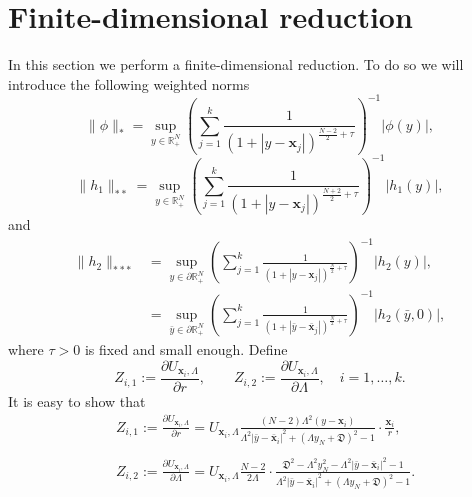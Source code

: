 \documentclass[11pt,a4paper]{amsart}
\begin{document}
\section{Finite-dimensional reduction}\label{riduzione}
In this section we perform a finite-dimensional reduction. To do so we will introduce the following weighted norms
\begin{equation}\label{norm1}
\|\phi\|_{*}=\sup _{y \in \mathbb{R}_{+}^{N}}\left(\sum_{j=1}^{k} \frac{1}{\left(1+\left|y-\mathbf{x}_{j}\right|\right)^{\frac{N-2}{2}+\tau}}\right)^{-1}|\phi(y)|,
\end{equation}
\begin{equation}\label{norm2}
\|h_1\|_{**}=\sup _{y \in \mathbb{R}_{+}^{N}}\left(\sum_{j=1}^{k} \frac{1}{\left(1+\left|y-\mathbf{x}_{j}\right|\right)^{\frac{N+2}{2}+\tau}}\right)^{-1}|h_1(y)|,
\end{equation}
and
\begin{equation}\label{norm3}
  \begin{aligned}
    \|h_2\|_{***}&=\sup _{y \in \partial\mathbb{R}_{+}^{N}}\left(\sum_{j=1}^{k} \frac{1}{\left(1+\left|y-\mathbf{x}_{j}\right|\right)^{\frac{N}{2}+\tau}}\right)^{-1}|h_2(y)|,\\
    &=\sup _{\bar{y} \in \partial\mathbb R^N_+}\left(\sum_{j=1}^{k} \frac{1}{\left(1+\left|\bar{y}-\bar{\mathbf{x}}_{j}\right|\right)^{\frac{N}{2}+\tau}}\right)^{-1}|h_2(\bar{y},0)|,
  \end{aligned}
  \end{equation}
where $\tau>0$ is fixed and small enough. 
\vspace{5pt}
Define \begin{equation}\label{ker}
Z_{i, 1}:=\frac{\partial U_{\mathbf{x}_i,\Lambda}}{\partial r},\qquad Z_{i, 2}:=\frac{\partial U_{\mathbf{x}_i,\Lambda}}{\partial \Lambda},\quad i=1, \ldots, k.\end{equation}
It is easy to show that
\begin{align}\label{eq.Z_i_1_2_expansion_1}
  &Z_{i,1} := \frac{\partial U_{\mathbf{x}_i,\Lambda}}{\partial r} = U_{\mathbf{x}_i,\Lambda}\frac{(N-2)\Lambda^2 \left(y-\mathbf{x}_i\right)}{{\Lambda^2|\bar{y}-\bar{\mathbf{x}}_{i}|}^2+{(\Lambda y_N+ \mathfrak{D})}^2-1} \cdot \frac{\mathbf{x}_i}{r},\\\nonumber\\ \label{eq.Z_i_1_2_expansion_2}
  &Z_{i,2} := \frac{\partial U_{\mathbf{x}_i,\Lambda}}{\partial \Lambda} =U_{\mathbf{x}_i,\Lambda} \frac{N-2}{2\Lambda} \cdot \frac{\mathfrak{D}^2-\Lambda^2 y_N^2-\Lambda^2\left|\bar{y}-\bar{\mathbf{x}}_i\right|^2-1}{{\Lambda^2|\bar{y}-\bar{\mathbf{x}}_{i}|}^2+{(\Lambda y_N+ \mathfrak{D})}^2-1}.
\end{align}
\end{document}
